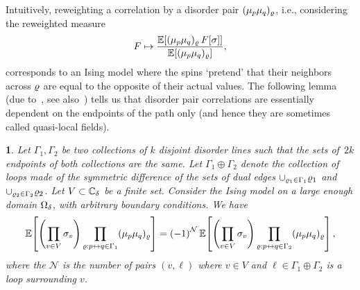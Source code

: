 \documentclass[12pt,oneside,english]{amsart}
\numberwithin{equation}{section}
\numberwithin{figure}{section}
\theoremstyle{plain}
\theoremstyle{plain}
\theoremstyle{plain}
\theoremstyle{plain}
\newtheorem{lem}[thm]{\protect\lemmaname}
\theoremstyle{remark}
\theoremstyle{definition}
\theoremstyle{plain}
\theoremstyle{plain}
\numberwithin{thm}{section}
\newcommand{\kallemod}[1]{{\color{kallecol} {#1}}}
\providecommand{\lemmaname}{Lemma}
\providecommand{\lemmaname}{Lemma}
\providecommand{\lemmaname}{Lemma}
\providecommand{\lemmaname}{Lemma}
\begin{document}
Intuitively, reweighting a correlation by a disorder pair 
$({\mu}_{p}{\mu}_{q})_{{\varrho}}$,
i.e., considering the reweighted measure 
\[
F \mapsto
\frac{\correl{ \dispair{p}{q}_{\disline} \, F[\spin] }}%
    {\correl{\dispair{p}{q}_{\disline} }} ,
\]
corresponds to an Ising model where the spins `pretend' that their 
neighbors
across ${\varrho}$ are equal to the opposite of their actual values.
The following lemma (due to~\cite{kadanoff-ceva}, see 
also~\cite{dubedat-i,dubedat-iii,chelkak-cimasoni-kassel})
tells us that disorder pair correlations are essentially dependent
on the endpoints of the path only (and hence they are sometimes called
quasi-local fields). 
\begin{lem}
\label{lem:disorder-gauge-invariance}Let $\Gamma_{1},\Gamma_{2}$
be two collections of $k$ disjoint disorder lines such that
the sets of~$2k$ endpoints of both collections are the same. Let 
$\Gamma_{1}\oplus\Gamma_{2}$ denote
the collection of loops made of the symmetric difference of the sets
of dual edges $\cup_{{\varrho}_{1}\in\Gamma_{1}} {\varrho}_{1}$ and 
$\cup_{{\varrho}_{2}\in\Gamma_{2}} {\varrho}_{2}$.
Let $V\subset{\mathbb{C}_{{\delta}}}$ be a finite set. Consider the Ising
model on a large enough domain ${{\Omega}}_{{\delta}}$, with arbitrary
boundary conditions. We have 
\begin{equation}
\mathbb{E} \! \left[ { \left( \prod_{v\in V} {\sigma}_{v} \right)
    \prod_{{\varrho} : p \leftrightarrow q \in \Gamma_{1}}
    ({\mu}_{p}{\mu}_{q})_{{\varrho}} } \right]
= \left(-1\right)^{\mathcal{N}}
  \mathbb{E} \! \left[ { \left( \prod_{v \in V}{\sigma}_{v} \right)
      \prod_{{\varrho}:p\leftrightarrow q \in \Gamma_{2}}
      ({\mu}_{p}{\mu}_{q})_{{\varrho}} } \right]
, \label{eq:disorder-gauge-invariance}
\end{equation}
where the $\mathcal{N}$ is the number of pairs $\left(v,\ell\right)$
where $v\in V$ and $\ell\in\Gamma_{1}\oplus\Gamma_{2}$ is a loop
surrounding $v$. 
\end{lem}
\end{document}
